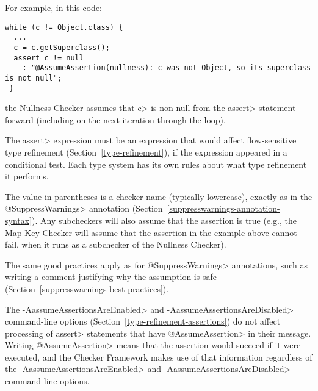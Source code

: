 For example, in this code:

\begin{Verbatim}
while (c != Object.class) {
  ...
  c = c.getSuperclass();
  assert c != null
    : "@AssumeAssertion(nullness): c was not Object, so its superclass is not null";
 }
\end{Verbatim}

\noindent
the Nullness Checker assumes that \<c> is non-null from the \<assert>
statement forward (including on the next iteration through the loop).

The \<assert> expression must be an expression that would affect flow-sensitive
type refinement (Section~\ref{type-refinement}), if the
expression appeared in a conditional test.  Each type system has its own
rules about what type refinement it performs.

The value in parentheses is a checker name (typically lowercase),
exactly as in the \<@SuppressWarnings> annotation
(Section~\ref{suppresswarnings-annotation-syntax}).
Any subcheckers will also assume that the
assertion is true (e.g., the Map Key Checker will assume that
the assertion in the example above cannot fail, when it runs
as a subchecker of the Nullness Checker).

The same good practices apply
as for \<@SuppressWarnings> annotations, such as writing a comment
justifying why the assumption is safe
(Section~\ref{suppresswarnings-best-practices}).

The \<-AassumeAssertionsAreEnabled> and \<-AassumeAssertionsAreDisabled>
command-line options (Section~\ref{type-refinement-assertions}) do not
affect processing of \<assert> statements that have \<@AssumeAssertion> in
their message.  Writing \<@AssumeAssertion> means that the assertion would
succeed if it were executed, and the Checker Framework makes use of that
information regardless of the \<-AassumeAssertionsAreEnabled> and
\<-AassumeAssertionsAreDisabled> command-line options.




